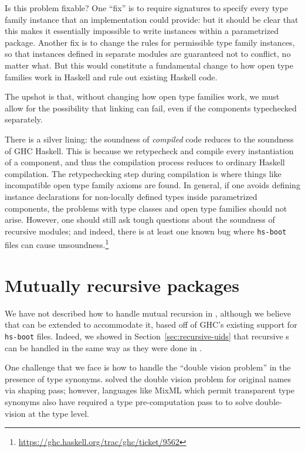 Is this problem fixable?  One ``fix'' is to require signatures to
specify every type family instance that an implementation could provide:
but it should be clear that this makes it essentially impossible to
write instances within a parametrized package.  Another fix is to change the rules for
permissible type family instances, so that instances defined in separate
modules are guaranteed not to conflict, no matter what.  But this would
constitute a fundamental change to how open type families work in
Haskell and rule out existing Haskell code.

The upshot is that, without changing how open type families work, we
must allow for the possibility that linking can fail, even if the
components typechecked separately.

There is a silver lining: the soundness of
\emph{compiled} \Backpack{} code reduces to the soundness of GHC
Haskell.  This is because we retypecheck and compile every instantiation
of a component, and thus the compilation process reduces to ordinary
Haskell compilation.  The retypechecking step during compilation is
where things like incompatible open type family axioms are found.
In general, if one avoids defining instance declarations for non-locally
defined types inside parametrized components, the problems with type
classes and open type families should not arise.  However, one should
still ask tough questions about the soundness of recursive modules;
and indeed, there is at least one known bug where \verb|hs-boot|
files can cause unsoundness.\footnote{\url{https://ghc.haskell.org/trac/ghc/ticket/9562}}

\section{Mutually recursive packages}

We have not described how to handle mutual recursion in \Backpack{},
although we believe that \Backpack{} can be extended to accommodate it,
based off of GHC's existing support for \verb|hs-boot| files.
Indeed, we showed in Section~\ref{sec:recursive-uids} that recursive
\uid{}s can be handled in the same way as they were done in \OldBackpack{}.

One challenge that we face is how to handle the ``double vision
problem'' in the presence of type synonyms.  \OldBackpack{} solved the
double vision problem for original names via  shaping pass; however,
languages like MixML which permit transparent type synonyms also have
required a type pre-computation pass to to solve double-vision at the
type level.


